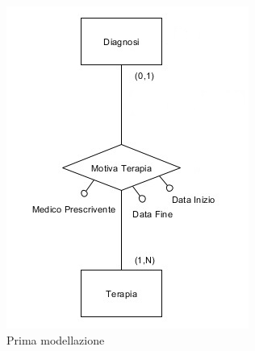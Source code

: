 \documentclass{article}
\begin{document}
\begin{figure}[!ht] %
  \centering 
  \begin{minipage}{.5\textwidth}
    \centering
    \includegraphics[width=\linewidth]{piccolo1}
    \caption{Prima modellazione}
    \label{fig:piccolo1}
  \end{minipage}%
  \begin{minipage}{.5\textwidth}
    \centering

\end{minipage}
\end{figure}
\end{document}
